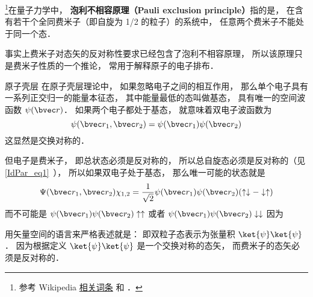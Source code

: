 
\footnote{参考 Wikipedia \href{https://en.wikipedia.org/wiki/Pauli_exclusion_principle}{相关词条} 和 \cite{GriffQ}．}在量子力学中， \textbf{泡利不相容原理（Pauli exclusion principle）}指的是， 在含有若干个全同费米子（即自旋为 1/2 的粒子）的系统中， 任意两个费米子不能处于同一个态．

事实上费米子对态矢的反对称性要求已经包含了泡利不相容原理， 所以该原理只是费米子性质的一个推论， 常用于解释原子的电子排布．

\begin{example}{原子壳层}
在原子壳层理论中， 如果忽略电子之间的相互作用， 那么单个电子具有一系列正交归一的能量本征态， 其中能量最低的态叫做基态， 具有唯一的空间波函数 $\psi(\bvec r)$． 如果两个电子都处于基态， 就意味着双电子波函数为
\begin{equation}
\psi(\bvec r_1, \bvec r_2) = \psi(\bvec r_1)\psi(\bvec r_2)
\end{equation}
这显然是交换对称的．

但电子是费米子， 即总状态必须是反对称的， 所以总自旋态必须是反对称的（见\autoref{IdPar_eq1}~）， 所以如果双电子处于基态， 那么唯一可能的状态就是
\begin{equation}
\Psi(\bvec r_1, \bvec r_2) \chi_{1,2} = \frac{1}{\sqrt{2}}\psi(\bvec r_1)\psi(\bvec r_2)(\uparrow\downarrow - \downarrow\uparrow)
\end{equation}
而不可能是 $\psi(\bvec r_1)\psi(\bvec r_2)\uparrow\uparrow$ 或者 $\psi(\bvec r_1)\psi(\bvec r_2)\downarrow\downarrow$ 因为
\end{example}

用矢量空间的语言来严格表述就是： 即双粒子态表示为张量积 $\ket{\psi}\ket{\psi}$． 因为根据定义 $\ket{\psi}\ket{\psi}$ 是一个交换对称的态矢， 而费米子的态矢必须是反对称的．
